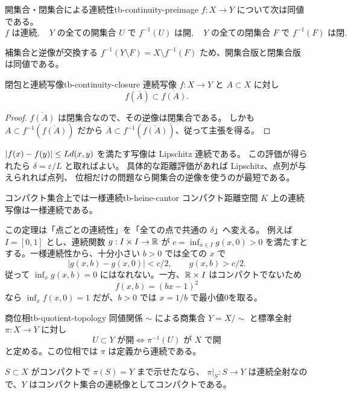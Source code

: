 \begin{theorem}{開集合・閉集合による連続性}{tb-continuity-preimage}
$f:X\to Y$ について次は同値である。
\[
f\text{ は連続},\quad
Y\text{ の全ての開集合 }U\text{ で }f^{-1}(U)\text{ は開},\quad
Y\text{ の全ての閉集合 }F\text{ で }f^{-1}(F)\text{ は閉}.
\]
\end{theorem}

補集合と逆像が交換する
$f^{-1}(Y\setminus F)=X\setminus f^{-1}(F)$ ため、開集合版と閉集合版は同値である。

\begin{proposition}{閉包と連続写像}{tb-continuity-closure}
連続写像 $f:X\to Y$ と $A\subset X$ に対し
\[
f(\overline A)\subset\overline{f(A)}.
\]
\end{proposition}

\begin{proof}
$\overline{f(A)}$ は閉集合なので、その逆像は閉集合である。
しかも $A\subset f^{-1}(\overline{f(A)})$ だから
$\overline A\subset f^{-1}(\overline{f(A)})$、従って主張を得る。
\end{proof}

$\lvert f(x)-f(y) \rvert\le Ld(x,y)$ を満たす写像は Lipschitz 連続である。
この評価が得られたら $\delta=\varepsilon/L$ と取ればよい。
具体的な距離評価があれば Lipschitz、点列が与えられれば点列、
位相だけの問題なら開集合の逆像を使うのが最短である。

\begin{theorem}{コンパクト集合上では一様連続}{tb-heine-cantor}
コンパクト距離空間 $K$ 上の連続写像は一様連続である。
\end{theorem}

この定理は「点ごとの連続性」を「全ての点で共通の $\delta$」へ変える。
例えば $I=[0,1]$ とし、連続関数 $g:I\times I\to\mathbb{R}$ が
$c=\inf_{x\in I}g(x,0)>0$ を満たすとする。一様連続性から、十分小さい $b>0$ では全ての $x$ で
\[
|g(x,b)-g(x,0)|<c/2,\qquad g(x,b)>c/2.
\]
従って $\inf_xg(x,b)=0$ にはなれない。一方、$\mathbb{R}\times I$ はコンパクトでないため
\[
f(x,b)=(bx-1)^2
\]
なら $\inf_xf(x,0)=1$ だが、$b>0$ では $x=1/b$ で最小値0を取る。

\begin{definition}{商位相}{tb-quotient-topology}
同値関係 $\sim$ による商集合 $Y=X/{\sim}$ と標準全射 $\pi:X\to Y$ に対し
\[
U\subset Y\text{ が開}\Longleftrightarrow\pi^{-1}(U)\text{ が }X\text{ で開}
\]
と定める。この位相では $\pi$ は定義から連続である。
\end{definition}

$S\subset X$ がコンパクトで $\pi(S)=Y$ まで示せたなら、
$\pi|_S:S\to Y$ は連続全射なので、$Y$ はコンパクト集合の連続像としてコンパクトである。

